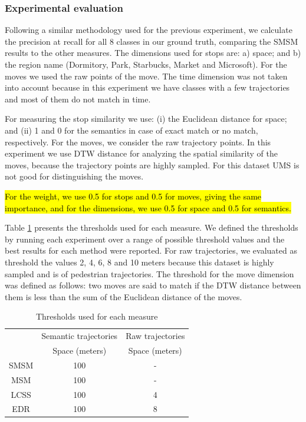 \documentclass[12pt]{article}
\begin{document}
\subsubsection{Experimental evaluation}

Following a similar methodology used for the previous experiment, we calculate the precision at recall for all 8 classes in our ground truth, comparing the SMSM results to the other measures. The dimensions used for stops are: a) space; and b) the region name (Dormitory, Park, Starbucks, Market and Microsoft). For the moves we used the raw points of the move. The time dimension was not taken into account because in this experiment we have classes with a few trajectories and most of them do not match in time.

For measuring the stop similarity we use: (i) the Euclidean distance for space; and (ii) 1 and 0 for the semantics in case of exact match or no match, respectively. For the moves,  we consider the raw trajectory points. In this experiment we use DTW distance for analyzing the spatial similarity of the moves, because the trajectory points are highly sampled. %
For this dataset UMS is not good for distinguishing the moves.

\hl{For the weight, we use 0.5 for stops and 0.5 for moves, giving the same importance, and for the dimensions, we use 0.5 for space and 0.5 for semantics.}

Table \ref{tab:geolife_thresholds} presents the thresholds used for each measure. We defined the thresholds by running each experiment over a range of possible threshold values and the best results for each method were reported. For raw trajectories, we evaluated as threshold the  values 2, 4, 6, 8 and 10 meters because this dataset is highly sampled and is of pedestrian trajectories. The threshold for the move dimension was defined as follows: two moves are said to match if the DTW distance between them is less than the sum of the Euclidean distance of the moves.

\begin{table}[!h]
\scriptsize
  \centering
  \begin{tabular}{|c|c|c|}
  	\hline
  & \multicolumn{1}{c|}{Semantic trajectories} & \multicolumn{1}{c|}{Raw trajectories} \\
 	\cline{2-3}
  & Space (meters) & Space (meters) \\
  	\hline
 SMSM & 100 & - \\
 MSM & 100 & - \\
 LCSS & 100 & 4 \\
 EDR & 100 & 8 \\
    \hline
  \end{tabular}
  \caption{Thresholds used for each measure}
  \label{tab:geolife_thresholds}
\end{table}
\end{document}
